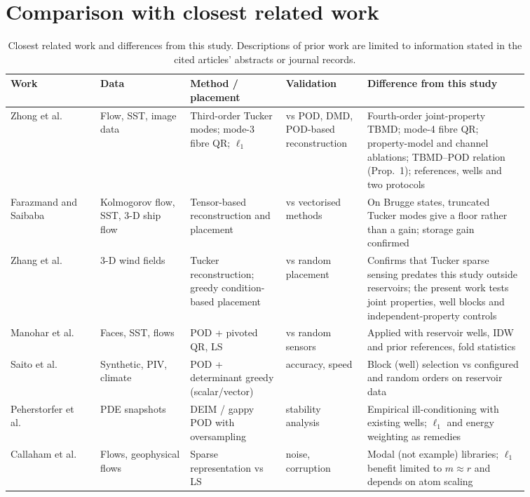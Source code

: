 \section{Comparison with closest related work}
\label{sec:S_novelty}
\begin{table}[htbp]
\centering
\scriptsize
\caption{Closest related work and differences from this study. Descriptions of prior work are limited to information stated in the cited articles' abstracts or journal records.}
\label{tab:S_novelty}
\begin{tabular}{@{}p{0.15\linewidth}p{0.15\linewidth}p{0.16\linewidth}p{0.13\linewidth}p{0.27\linewidth}@{}}
\toprule
Work & Data & Method / placement & Validation & Difference from this study \\
\midrule
Zhong et al.\ \cite{zhong2024tbmd} & Flow, SST, image data & Third-order Tucker modes; mode-3 fibre QR; $\ell_1$ & vs POD, DMD, POD-based reconstruction & Fourth-order joint-property TBMD; mode-4 fibre QR; property-model and channel ablations; TBMD--POD relation (Prop.~1); references, wells and two protocols \\
Farazmand and Saibaba \cite{farazmand2023} & Kolmogorov flow, SST, 3-D ship flow & Tensor-based reconstruction and placement & vs vectorised methods & On Brugge states, truncated Tucker modes give a floor rather than a gain; storage gain confirmed \\
Zhang et al.\ \cite{zhang2022wind} & 3-D wind fields & Tucker reconstruction; greedy condition-based placement & vs random placement & Confirms that Tucker sparse sensing predates this study outside reservoirs; the present work tests joint properties, well blocks and independent-property controls \\
Manohar et al.\ \cite{manohar2018} & Faces, SST, flows & POD + pivoted QR, LS & vs random sensors & Applied with reservoir wells, IDW and prior references, fold statistics \\
Saito et al.\ \cite{saito2021,saito2020vector} & Synthetic, PIV, climate & POD + determinant greedy (scalar/vector) & accuracy, speed & Block (well) selection vs configured and random orders on reservoir data \\
Peherstorfer et al.\ \cite{peherstorfer2020} & PDE snapshots & DEIM / gappy POD with oversampling & stability analysis & Empirical ill-conditioning with existing wells; $\ell_1$ and energy weighting as remedies \\
Callaham et al.\ \cite{callaham2019} & Flows, geophysical flows & Sparse representation vs LS & noise, corruption & Modal (not example) libraries; $\ell_1$ benefit limited to $m\approx r$ and depends on atom scaling \\

\end{tabular}
\end{table}

